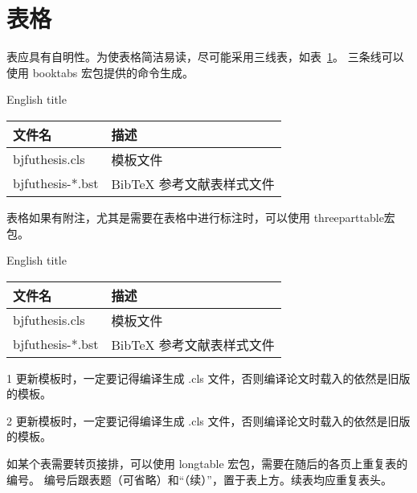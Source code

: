 \section{表格}

表应具有自明性。为使表格简洁易读，尽可能采用三线表，如表~\ref{tab:three-line}。
三条线可以使用 booktabs 宏包提供的命令生成。

\begin{table}[h]
	\xiaowu

	\centering
	 {English title}
	\begin{tabular}{ll}
		\toprule
		文件名           & 描述                      \\
		\midrule
		bjfuthesis.cls   & 模板文件                  \\
		bjfuthesis-*.bst & BibTeX 参考文献表样式文件 \\
		\bottomrule
	\end{tabular}
	\label{tab:three-line}
\end{table}

表格如果有附注，尤其是需要在表格中进行标注时，可以使用 threeparttable宏包。

\begin{table}[h]
	\xiaowu
	\centering
	\begin{threeparttable}[c]
		 {English title}
		\label{tab:three-part-table}
		\begin{tabular}{ll}
			\toprule
			文件名                     & 描述                      \\
			\midrule
			bjfuthesis.cls\tnote{1}    & 模板文件                  \\
			bjfuthesis-*.bst \tnote{2} & BibTeX 参考文献表样式文件 \\
			\bottomrule
		\end{tabular}
		\begin{tablenotes}

			\item [1] 更新模板时，一定要记得编译生成 .cls 文件，否则编译论文时载入的依然是旧版的模板。
			\item [2] 更新模板时，一定要记得编译生成 .cls 文件，否则编译论文时载入的依然是旧版的模板。
		\end{tablenotes}
	\end{threeparttable}
\end{table}

如某个表需要转页接排，可以使用 longtable 宏包，需要在随后的各页上重复表的编号。
编号后跟表题（可省略）和“（续）”，置于表上方。续表均应重复表头。


